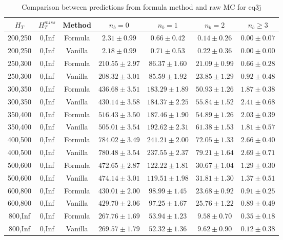 \begin{longtable}{ | c | c | c | c | c | c | c | }
\caption{Comparison between predictions from formula method and raw MC for eq3j} \label{tab:formula-eq3j} \\    \hline 
$H_{T}$ & $H_{T}^{miss}$ & Method & $n_{b} = 0$ & $n_{b} = 1$ & $n_{b} = 2$ & $n_{b} \ge 3$ \\ \hline200,250 & 0,Inf & Formula  & $     2.31 \pm  0.99 $ & $     0.66 \pm  0.42 $ & $     0.14 \pm  0.26 $ & $     0.00 \pm  0.07 $  \\  
200,250 & 0,Inf & Vanilla  & $     2.18 \pm  0.99 $ & $     0.71 \pm  0.53 $ & $     0.22 \pm  0.36 $ & $     0.00 \pm  0.00 $  \\ \hline 
250,300 & 0,Inf & Formula  & $   210.55 \pm  2.97 $ & $    86.37 \pm  1.60 $ & $    21.09 \pm  0.99 $ & $     0.66 \pm  0.28 $  \\  
250,300 & 0,Inf & Vanilla  & $   208.32 \pm  3.01 $ & $    85.59 \pm  1.92 $ & $    23.85 \pm  1.29 $ & $     0.92 \pm  0.48 $  \\ \hline 
300,350 & 0,Inf & Formula  & $   436.68 \pm  3.51 $ & $   183.29 \pm  1.89 $ & $    50.93 \pm  1.26 $ & $     1.87 \pm  0.38 $  \\  
300,350 & 0,Inf & Vanilla  & $   430.14 \pm  3.58 $ & $   184.37 \pm  2.25 $ & $    55.84 \pm  1.52 $ & $     2.41 \pm  0.68 $  \\ \hline 
350,400 & 0,Inf & Formula  & $   516.43 \pm  3.50 $ & $   187.46 \pm  1.90 $ & $    54.89 \pm  1.26 $ & $     2.03 \pm  0.39 $  \\  
350,400 & 0,Inf & Vanilla  & $   505.01 \pm  3.54 $ & $   192.62 \pm  2.31 $ & $    61.38 \pm  1.53 $ & $     1.81 \pm  0.57 $  \\ \hline 
400,500 & 0,Inf & Formula  & $   784.02 \pm  3.49 $ & $   241.21 \pm  2.00 $ & $    72.05 \pm  1.33 $ & $     2.66 \pm  0.40 $  \\  
400,500 & 0,Inf & Vanilla  & $   780.48 \pm  3.54 $ & $   237.55 \pm  2.37 $ & $    79.21 \pm  1.64 $ & $     2.69 \pm  0.71 $  \\ \hline 
500,600 & 0,Inf & Formula  & $   472.65 \pm  2.87 $ & $   122.22 \pm  1.81 $ & $    30.67 \pm  1.04 $ & $     1.29 \pm  0.30 $  \\  
500,600 & 0,Inf & Vanilla  & $   474.14 \pm  3.01 $ & $   119.51 \pm  1.98 $ & $    31.81 \pm  1.30 $ & $     1.37 \pm  0.51 $  \\ \hline 
600,800 & 0,Inf & Formula  & $   430.01 \pm  2.00 $ & $    98.99 \pm  1.45 $ & $    23.68 \pm  0.92 $ & $     0.91 \pm  0.25 $  \\  
600,800 & 0,Inf & Vanilla  & $   429.70 \pm  2.06 $ & $    97.25 \pm  1.67 $ & $    25.76 \pm  1.22 $ & $     0.89 \pm  0.49 $  \\ \hline 
800,Inf & 0,Inf & Formula  & $   267.76 \pm  1.69 $ & $    53.94 \pm  1.23 $ & $     9.58 \pm  0.70 $ & $     0.35 \pm  0.18 $  \\  
800,Inf & 0,Inf & Vanilla  & $   269.57 \pm  1.79 $ & $    52.32 \pm  1.36 $ & $     9.62 \pm  0.90 $ & $     0.12 \pm  0.38 $  \\ \hline 
    \hline 
    \hline 
\end{longtable}
